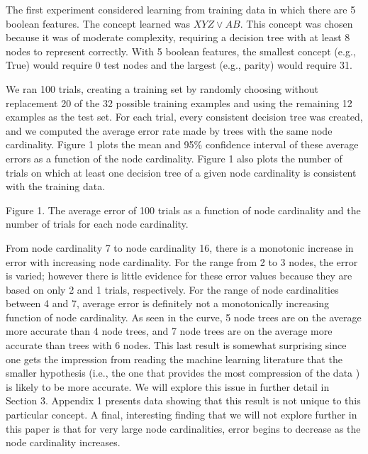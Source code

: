The first experiment considered learning from training data in
which there are 5 boolean features.  The concept learned was $XYZ
\vee AB$. This concept was chosen because it was of moderate complexity, 
requiring a decision tree with at least 8 nodes to represent
correctly. With 5 boolean features, the smallest concept (e.g., True)
would require 0 test nodes and the largest (e.g., parity) would
require 31.

We ran 100 trials, creating a training set by randomly choosing
without replacement 20 of the 32 possible training examples and using
the remaining 12 examples as the test set.  For each trial, every
consistent decision tree was created, and we computed the average error
rate made by trees with the same node cardinality.  Figure 1 plots the
mean and 95\% confidence interval of these average errors as a
function of the node cardinality.  Figure 1 also plots the number of
trials on which at least one decision tree of a given node cardinality
is consistent with the training data.

\vspace*{0.3cm}
\hspace{0.6cm}
\centerline{}

\vspace{0.2cm}
\parindent 0.0cm
Figure 1. The average error of 100 trials as a function of 
node cardinality and the number of trials for each node cardinality.\\
\parindent 0.6cm
\parskip 0.0cm

From node cardinality 7 to node cardinality 16, there is a monotonic
increase in error with increasing node cardinality.  For the range
from 2 to 3 nodes, the error is varied; however there is little evidence
for these error values because they are based on only 2 and 1 trials,
respectively.  For the range of node cardinalities between 4 and 7,
average error is definitely not a monotonically increasing function of
node cardinality.  As seen in the curve, 5 node trees are on the average
more accurate than 4 node trees, and 7 node trees are on the average
more accurate than trees with 6 nodes. This last result is somewhat
surprising since one gets the impression from reading the machine
learning literature \cite{muggleton92} that
the smaller hypothesis (i.e., the one that provides the most
compression of the data \cite{rissanen78}) is likely to be more
accurate.  We will explore this issue in further detail in Section 3.
Appendix 1 presents data showing that this result is not unique to
this particular concept.  A final, interesting finding that we will
not explore further in this paper is that for very large node
cardinalities, error begins to decrease as the node cardinality
increases.

